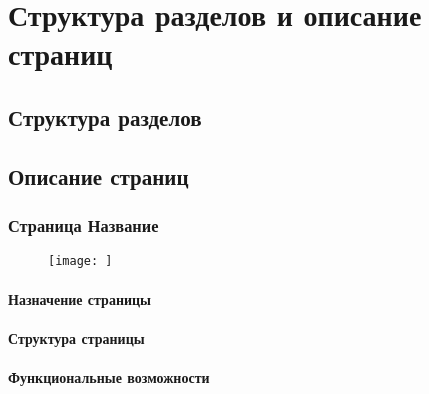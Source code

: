\section{Структура разделов и описание страниц}
\subsection{Структура разделов}

\subsection{Описание страниц}
\subsubsection{Страница Название}
\begin{figure}[H]
	\texttt{[image: ]}
\end{figure}

\paragraph{Назначение страницы}
\paragraph{Структура страницы}
\paragraph{Функциональные возможности}
